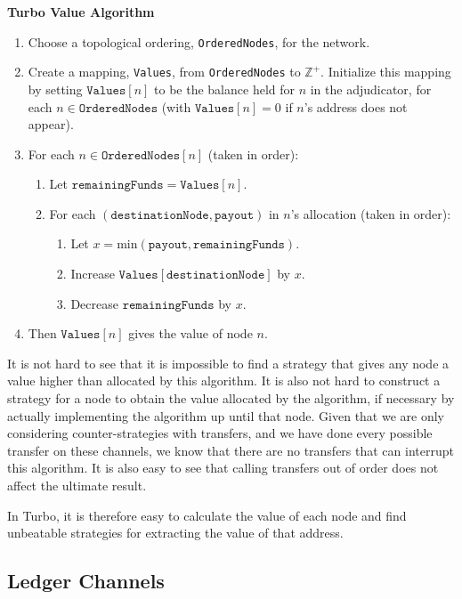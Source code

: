 \textbf{Turbo Value Algorithm}
\begin{enumerate}
  \item Choose a topological ordering, \texttt{OrderedNodes}, for the network.
  \item Create a mapping, \texttt{Values}, from \texttt{OrderedNodes} to $\mathbb{Z}^+$. Initialize this mapping by setting $\texttt{Values}[n]$ to be the balance held for $n$ in the adjudicator, for each $n \in \texttt{OrderedNodes}$ (with $\texttt{Values}[n] = 0$ if $n$'s address does not appear).
  \item For each $n \in \texttt{OrderedNodes}[n]$ (taken in order):
  \begin{enumerate}
    \item Let $\texttt{remainingFunds} = \texttt{Values}[n]$.
    \item For each $(\texttt{destinationNode}, \texttt{payout})$ in $n$'s allocation (taken in order):
      \begin{enumerate}
        \item Let $x = \text{min}(\texttt{payout}, \texttt{remainingFunds})$.
        \item Increase $\texttt{Values}[\texttt{destinationNode}]$ by $x$.
        \item Decrease $\texttt{remainingFunds}$ by $x$.
      \end{enumerate}
  \end{enumerate}
  \item Then $\texttt{Values}[n]$ gives the value of node $n$.
\end{enumerate}

It is not hard to see that it is impossible to find a strategy that gives any node a value higher than allocated by this algorithm.
It is also not hard to construct a strategy for a node to obtain the value allocated by the algorithm, if necessary by actually implementing the algorithm up until that node.
Given that we are only considering counter-strategies with transfers, and we have done every possible transfer on these channels, we know that there are no transfers that can interrupt this algorithm.
It is also easy to see that calling transfers out of order does not affect the ultimate result.

In Turbo, it is therefore easy to calculate the value of each node and find unbeatable strategies for extracting the value of that address.

\subsection{Ledger Channels}

